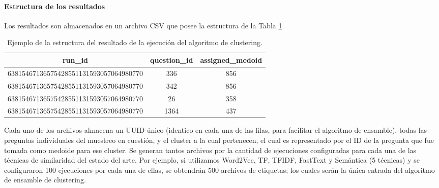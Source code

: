 \paragraph{Estructura de los resultados}
Los resultados son almacenados en un archivo CSV que posee la estructura de la Tabla \ref{tab:salida-clustering}.
\begin{table}[h!]
	\footnotesize
	\caption{Ejemplo de la estructura del resultado de la ejecución del algoritmo de clustering.}
	\begin{tabularx}{\textwidth}{ccc}
		\toprule
		\textbf{run\_id}                       & \textbf{question\_id} & \textbf{assigned\_medoid} \\
		\midrule
		63815467136575428551131593057064980770 & 336 & 856  \\
		63815467136575428551131593057064980770 & 342& 856 \\
		63815467136575428551131593057064980770 & 26 & 358 \\
		63815467136575428551131593057064980770 & 1364 & 437 \\
		\bottomrule
	\end{tabularx}
	\label{tab:salida-clustering}
\end{table}
Cada uno de los archivos almacena un UUID único (identico en cada una de las filas, para facilitar el algoritmo de ensamble), todas las preguntas individuales del muestreo en cuestión, y el cluster a la cual pertenecen, el cual es representado por el ID de la pregunta que fue tomada como medoide para ese cluster. Se generan tantos archivos por la cantidad de ejecuciones configuradas para cada una de las técnicas de similaridad del estado del arte. Por ejemplo, si utilizamos Word2Vec, TF, TFIDF, FastText y Semántica (5 técnicas) y se configuraron 100 ejecuciones por cada una de ellas, se obtendrán 500 archivos de etiquetas; los cuales serán la única entrada del algoritmo de ensamble de clustering.





